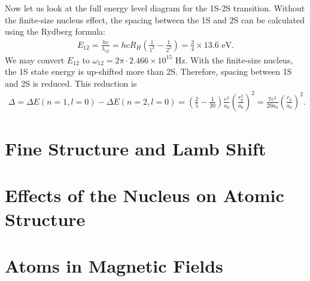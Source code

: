 \documentclass{book}
\theoremstyle{definition}
\newcommand{\f}[2]{\frac{#1}{#2}}
\newcommand{\lp}{\left(}
\newcommand{\rp}{\right)}
\begin{document}
\begin{enumerate}[label=(\alph*)]
	
	
	Now let us look at the full energy level diagram for the 1S-2S transition. Without the finite-size nucleus effect, the spacing between the 1S and 2S can be calculated using the Rydberg formula:
	\begin{align*}
		E_{12} = \f{hc}{\lambda_{12}} = hc R_H \lp \f{1}{1^2} - \f{1}{2^2} \rp = \f{3}{4} \times  13.6 \text{ eV}.
	\end{align*}
	We may convert $E_{12}$ to $\omega_{12} = 2\pi \cdot 2.466 \times 10^{15} \text{ Hz}$. With the finite-size nucleus, the 1S state energy is up-shifted more than 2S. Therefore, spacing between 1S and 2S is reduced. This reduction is 
	\begin{align*}
		\Delta = \Delta E(n=1,l=0) - \Delta E(n=2,l=0) = \lp \f{2}{5} - \f{1}{20} \rp \f{e^2}{a_0} \lp \f{r_p^2}{a_0} \rp^2 = \f{7e^2}{20a_0} \lp \f{r_p}{a_0} \rp^2. 
	\end{align*}
	
\end{enumerate}





\chapter{Fine Structure and Lamb Shift}
















\chapter{Effects of the Nucleus on Atomic Structure}














\chapter{Atoms in Magnetic Fields}
\end{document}
